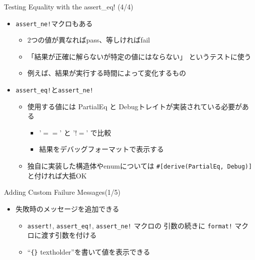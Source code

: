 \documentclass[cjk,14pt,xcolor=dvipsnames,table,dvipdfmx,professional font,t,fragile]{beamer}
\begin{document}
\begin{frame}[containsverbatim]{Testing Equality with the assert\_eq! (4/4)}
 \begin{itemize}
  \item \verb|assert_ne!|マクロもある
	\begin{itemize}
	 \item $2$つの値が異なればpass、等しければfail
	 \item 「結果が正確に解らないが特定の値にはならない」
	       というテストに使う
	 \item 例えば、結果が実行する時間によって変化するもの
	\end{itemize}
  \item \verb|assert_eq!|と\verb|assert_ne!|
	\begin{itemize}
	 \item 使用する値には PartialEq と Debugトレイトが実装されている必要がある
	       \begin{itemize}
		\item '$==$' と '$!=$' で比較
		\item 結果をデバッグフォーマットで表示する
	       \end{itemize}
	 \item 独自に実装した構造体やenumについては
	       \verb|#[derive(PartialEq, Debug)]| と付ければ大抵OK
	\end{itemize}
 \end{itemize}
\end{frame}

\begin{frame}[containsverbatim]{Adding Custom Failure Messages(1/5)}
 \begin{itemize}
  \item 失敗時のメッセージを追加できる
	\begin{itemize}
	 \item \verb|assert!|, \verb|assert_eq!|, \verb|assert_ne!| マクロの
	       引数の続きに \verb|format!| マクロに渡す引数を付ける
	 \item ``\verb|{}| textholder''を書いて値を表示できる
	\end{itemize}
 \end{itemize}
\end{frame}
\end{document}
